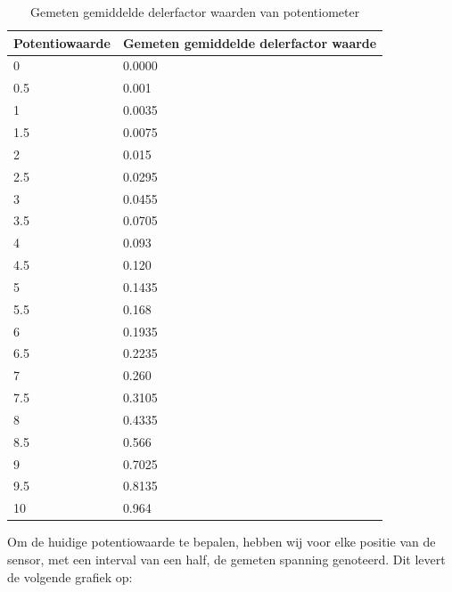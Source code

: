 \documentclass[a4paper,12pt]{article}
\begin{document}
\begin{table}[h!]
\centering
\label{tab:measurings}
\begin{tabular}{l | l}
Potentiowaarde & Gemeten gemiddelde delerfactor waarde \\
\hline
0              & 0.0000                               \\
0.5            & 0.001                                \\
1              & 0.0035                               \\
1.5            & 0.0075                               \\
2              & 0.015                                \\
2.5            & 0.0295                               \\
3              & 0.0455                               \\
3.5            & 0.0705                               \\
4              & 0.093                                \\
4.5            & 0.120                                \\
5              & 0.1435                               \\
5.5            & 0.168                                \\
6              & 0.1935                               \\
6.5            & 0.2235                               \\
7              & 0.260                                \\
7.5            & 0.3105                               \\
8              & 0.4335                               \\
8.5            & 0.566                                \\
9              & 0.7025                               \\
9.5            & 0.8135                               \\
10             & 0.964                                
\end{tabular}
\caption{Gemeten gemiddelde delerfactor waarden van potentiometer}
\end{table}

Om de huidige potentiowaarde te bepalen, hebben wij voor elke positie van de sensor, met een interval van een half, de gemeten spanning genoteerd. Dit levert de volgende grafiek op:
\end{document}
